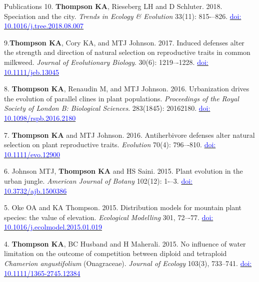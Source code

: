 \documentclass[11pt]{article}
\begin{document}
\begin{rSection}{Publications}
\noindent\hspace{.1cm}10. \textbf{Thompson KA}, Rieseberg LH and D Schluter. 2018. Speciation and the city. \textit{Trends in Ecology \& Evolution} 33(11): 815-–826. \href{https://doi.org/10.1016/j.tree.2018.08.007}{\textcolor{blue}{doi: 10.1016/j.tree.2018.08.007}}

\noindent\hspace{.1cm}9.\quad \textbf{Thompson KA}, Cory KA, and MTJ Johnson. 2017. Induced defenses alter the strength and direction of natural selection on reproductive traits in common milkweed. \textit{Journal of Evolutionary Biology}. 30(6): 1219–-1228. \href{https://doi.org/10.1111/jeb.13045}{\textcolor{blue}{doi: 10.1111/jeb.13045}}

\noindent\hspace{.1cm}8. \textbf{Thompson KA}, Renaudin M, and MTJ Johnson. 2016. Urbanization drives the evolution of parallel clines in plant populations. \textit{Proceedings of the Royal Society of London B: Biological Sciences}. 283(1845): 20162180. \href{https://doi.org/10.1098/rspb.2016.2180}{\textcolor{blue}{doi: 10.1098/rspb.2016.2180}}

\noindent\hspace{.1cm}7. \textbf{Thompson KA} and MTJ Johnson. 2016. Antiherbivore defenses alter natural selection on plant reproductive traits. \textit{Evolution} 70(4): 796–-810. \href{https://doi.org/10.1111/evo.12900}{\textcolor{blue}{doi: 10.1111/evo.12900}}


\noindent\hspace{.1cm}6. Johnson MTJ, \textbf{Thompson KA} and HS Saini. 2015. Plant evolution in the urban jungle. \textit{American Journal of Botany} 102(12): 1-–3. \href{https://doi.org/10.3732/ajb.1500386}{\textcolor{blue}{doi: 10.3732/ajb.1500386}}

\noindent\hspace{.1cm}5. Oke OA and KA Thompson. 2015. Distribution models for mountain plant species: the value of elevation. \textit{Ecological Modelling} 301, 72–-77. \href{https://doi.org/10.1016/j.ecolmodel.2015.01.019}{\textcolor{blue}{doi: 10.1016/j.ecolmodel.2015.01.019}}

\noindent\hspace{.1cm}4. \textbf{Thompson KA}, BC Husband and H Maherali. 2015. No influence of water limitation on the outcome of competition between diploid and tetraploid \textit{Chamerion angustifolium} (Onagraceae). \textit{Journal of Ecology} 103(3), 733–741. \href{https://doi.org/10.1111/1365-2745.12384}{\textcolor{blue}{doi: 10.1111/1365-2745.12384}}


\end{rSection}
\end{document}
